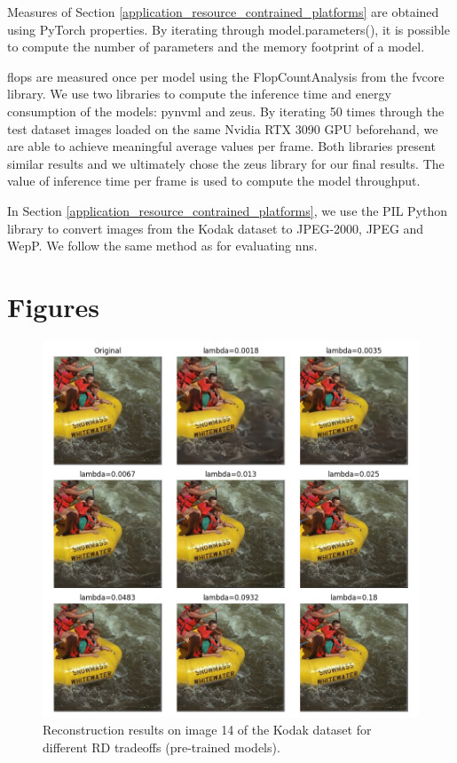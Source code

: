 \documentclass{article}
\begin{document}
Measures of Section \ref{application_resource_contrained_platforms} are obtained using PyTorch properties. By iterating through \textsf{model.parameters()}, it is possible to compute the number of parameters and the memory footprint of a model.

\acrshort{flop}s are measured once per model using the \textsf{FlopCountAnalysis} from the fvcore library. We use two libraries to compute the inference time and energy consumption of the models: pynvml and zeus. By iterating 50 times through the test dataset images loaded on the same Nvidia RTX 3090 GPU beforehand, we are able to achieve meaningful average values per frame. Both libraries present similar results and we ultimately chose the zeus library for our final results. The value of inference time per frame is used to compute the model throughput.

In Section \ref{application_resource_contrained_platforms}, we use the PIL Python library to convert images from the Kodak dataset to JPEG-2000, JPEG and WepP. We follow the same method as for evaluating \acrshort{nn}s.

\section{Figures}

\begin{figure}
  \centering
  \includegraphics[width=15cm]{bdpsnr_kodak_14_pretrained.png}
  \caption[Reconstruction results on image 14 of the Kodak dataset for different RD tradeoffs (pre-trained models).]{Reconstruction results on image 14 of the Kodak dataset for different RD tradeoffs (pre-trained models).}
  \label{appendix:pretrained}
\end{figure}
\end{document}

